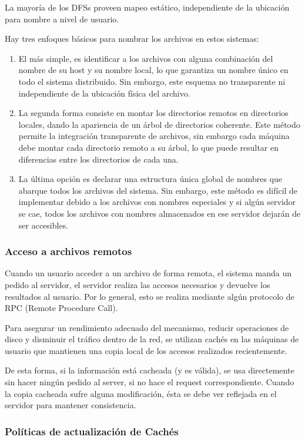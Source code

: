 La mayoría de los DFSs proveen mapeo estático, independiente de la ubicación para nombre a nivel de usuario.

Hay tres enfoques básicos para nombrar los archivos en estos sistemas: 
\begin{enumerate}
	\item El más simple, es identificar a los archivos con alguna combinación del nombre de su host y su nombre local, lo que garantiza un nombre único en todo el sistema distribuido. Sin embargo, este esquema no transparente ni independiente de la ubicación física del archivo.
	\item La segunda forma consiste en montar los directorios remotos en directorios locales, dando la apariencia de un árbol de directorios coherente. Este método permite la integración transparente de archivos, sin embargo cada máquina debe montar cada directorio remoto a su árbol, lo que puede resultar en diferencias entre los directorios de cada una.
	\item La última opción es declarar una estructura única global de nombres que abarque todos los archivos del sistema. Sin embargo, este método es difícil de implementar debido a los archivos con nombres especiales y si algún servidor se cae, todos los archivos con nombres almacenados en ese servidor dejarán de ser accesibles.
\end{enumerate}

\subsubsection{Acceso a archivos remotos}
Cuando un usuario acceder a un archivo de forma remota, el sistema manda un pedido al servidor, el servidor realiza las accesos necesarios y devuelve los resultados al usuario. Por lo general, esto se realiza mediante algún protocolo de RPC (Remote Procedure Call).


Para asegurar un rendimiento adecuado del mecanismo, reducir operaciones de disco y disminuir el tráfico dentro de la red, se utilizan cachés en las máquinas de usuario que mantienen una copia local de los accesos realizados recientemente.

De esta forma, si la información está cacheada (y es válida), se usa directemente sin hacer ningún pedido al server, si no hace el request correspondiente. Cuando la copia cacheada sufre alguna modificación, ésta se debe ver reflejada en el servidor para mantener consistencia.

\subsubsection*{Políticas de actualización de Cachés}

